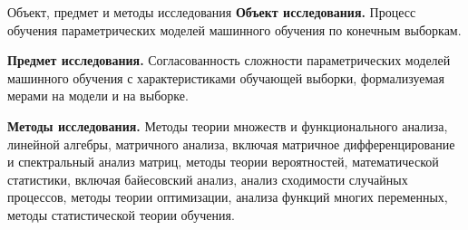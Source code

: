 \documentclass[9pt,pdf,hyperref={unicode}]{beamer}
\begin{document}
\begin{frame}{Объект, предмет и методы исследования}
\justifying
\small
\textbf{Объект исследования.} Процесс обучения параметрических моделей машинного обучения по конечным выборкам.

\vspace{0.3cm}
\textbf{Предмет исследования.} Согласованность сложности параметрических моделей машинного обучения с характеристиками обучающей выборки, формализуемая мерами на модели и на выборке.

\vspace{0.3cm}
\textbf{Методы исследования.} Методы теории множеств и функционального анализа, линейной алгебры, матричного анализа, включая матричное дифференцирование и спектральный анализ матриц, методы теории вероятностей, математической статистики, включая байесовский анализ, анализ сходимости случайных процессов, методы теории оптимизации, анализа функций многих переменных, методы статистической теории обучения.
\end{frame}
\end{document}

